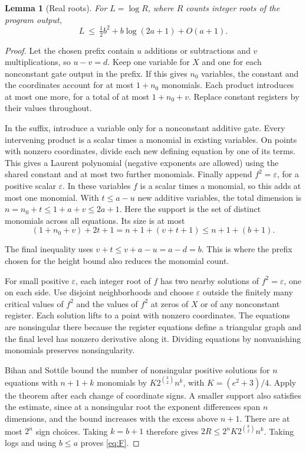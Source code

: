 \documentclass[11pt,letterpaper]{article}
\newtheorem{lemma}{Lemma}
\begin{document}
\begin{lemma}[Real roots]\label{lem:real}
For \(L=\log R\), where \(R\) counts integer roots of the program output,
\[
 L\ \le\ \tfrac12 b^2+b\log(2a+1)+O(a+1).
 \tag{F}\label{eq:F}
\]
\end{lemma}
\begin{proof}
Let the chosen prefix contain \(u\) additions or subtractions and \(v\)
multiplications, so \(u-v=d\). Keep one variable for \(X\) and one for
each nonconstant gate output in the prefix. If this gives \(n_0\) variables,
the constant and the coordinates account for at most \(1+n_0\) monomials.
Each product introduces at most one more, for a total of at most \(1+n_0+v\).
Replace constant registers by their values throughout.

In the suffix, introduce a variable only for a nonconstant additive gate.
Every intervening product is a scalar times a monomial in existing
variables. On points with nonzero coordinates, divide each new defining
equation by one of its terms. This gives a Laurent polynomial (negative
exponents are allowed) using the shared constant and at most two further
monomials. Finally append \(f^2=\varepsilon\), for a positive scalar
\(\varepsilon\). In these variables \(f\) is a scalar times a monomial,
so this adds at most one monomial. With \(t\le a-u\) new additive
variables, the total dimension is \(n=n_0+t\le1+a+v\le 2a+1\).
Here the support is the set of distinct monomials across all equations. Its size is at most
\[
 (1+n_0+v)+2t+1=n+1+(v+t+1)\le n+1+(b+1).
\]

The final inequality uses \(v+t\le v+a-u=a-d=b\). This is where the
prefix chosen for the height bound also reduces the monomial count.

For small positive \(\varepsilon\), each integer root of \(f\) has two
nearby solutions of \(f^2=\varepsilon\), one on each side. Use disjoint
neighborhoods and choose \(\varepsilon\) outside the finitely many critical
values of \(f^2\) and the values of \(f^2\) at zeros of \(X\) or of any
nonconstant register. Each solution lifts to a point with nonzero
coordinates. The equations are nonsingular there because the register
equations define a triangular graph and the final level has nonzero
derivative along it. Dividing equations by nonvanishing monomials
preserves nonsingularity.

Bihan and Sottile \cite{BS} bound the number of nonsingular positive
solutions for \(n\) equations with \(n+1+k\) monomials by
\(K2^{\binom{k}{2}}n^k\), with \(K=(e^2+3)/4\).
Apply the theorem after each change of coordinate signs. A smaller support
also satisfies the estimate, since at a nonsingular root the exponent differences span \(n\) dimensions,
and the bound increases with the excess above \(n+1\).
There are at most \(2^n\) sign choices. Taking \(k=b+1\) therefore gives
\(2R\le 2^n K2^{\binom{k}{2}}n^k\). Taking logs and using \(b\le a\)
proves \eqref{eq:F}.
\end{proof}
\end{document}
